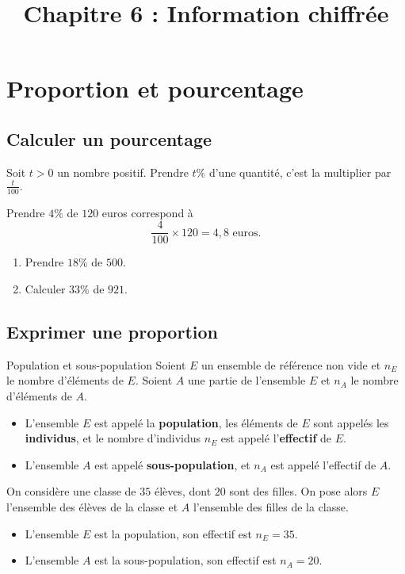 \documentclass[11pt]{article}
\title{Chapitre 6 : Information chiffrée}
\date{}
\author{}
\begin{document}
\maketitle\thispagestyle{fancy}

\section{Proportion et pourcentage}
\subsection{Calculer un pourcentage}
\begin{prop}
  Soit $t>0$ un nombre positif. Prendre $t\%$ d'une quantité, c'est la
  multiplier par
  \(
    \frac{t}{100}.
  \)
\end{prop}
\begin{exemple}
  Prendre $4\%$ de $120$ euros correspond à
  \[
    \frac{4}{100}\times 120 = 4,8\text{ euros.}
  \]
\end{exemple}
\begin{app}
  \begin{enumerate}
    \item Prendre $18\%$ de $500$.
    \item Calculer $33\%$ de $921$.
  \end{enumerate}
\end{app}

\subsection{Exprimer une proportion}
\begin{defi}{Population et sous-population}
  Soient $E$ un ensemble de référence non vide et $n_E$ le nombre d'éléments de
  $E$. Soient $A$ une partie de l'ensemble $E$ et $n_A$ le nombre d'éléments de
  $A$.
  \begin{itemize}
    \item L'ensemble $E$ est appelé la \textbf{population}, les éléments de $E$
      sont appelés les \textbf{individus}, et le nombre d'individus $n_E$ est
      appelé l'\textbf{effectif} de $E$.
    \item L'ensemble $A$ est appelé \textbf{sous-population}, et $n_A$ est
      appelé l'effectif de $A$.
  \end{itemize}
\end{defi}
\begin{exemple}
  On considère une classe de $35$ élèves, dont $20$ sont des filles. On pose
  alors $E$ l'ensemble des élèves de la classe et $A$ l'ensemble des filles de
  la classe.
  \begin{itemize}
    \item L'ensemble $E$ est la population, son effectif est $n_E=35$.
    \item L'ensemble $A$ est la sous-population, son effectif est $n_A=20$.
  \end{itemize}
\end{exemple}
\end{document}
